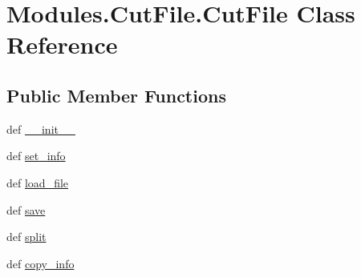 \hypertarget{classModules_1_1CutFile_1_1CutFile}{\section{Modules.\-Cut\-File.\-Cut\-File Class Reference}
\label{classModules_1_1CutFile_1_1CutFile}
}
\subsection*{Public Member Functions}
\begin{DoxyCompactItemize}
\item 
def \hyperlink{classModules_1_1CutFile_1_1CutFile_a77f945f7b5806ad366101621cf0f1090}{\-\_\-\-\_\-init\-\_\-\-\_\-}
\item 
def \hyperlink{classModules_1_1CutFile_1_1CutFile_abbefde5e9218868e815110a427b89f82}{set\-\_\-info}
\item 
def \hyperlink{classModules_1_1CutFile_1_1CutFile_a3e74135fa738e9fbee272b0cb3c4c560}{load\-\_\-file}
\item 
def \hyperlink{classModules_1_1CutFile_1_1CutFile_a1b5dd6971e91ee35f8a7a432410fd9d1}{save}
\item 
def \hyperlink{classModules_1_1CutFile_1_1CutFile_acdb33341563b9a0806c02e2566a0dbdb}{split}
\item 
def \hyperlink{classModules_1_1CutFile_1_1CutFile_a69f3dc0b72f13193d66fbb2d672bb7e7}{copy\-\_\-info}
\end{DoxyCompactItemize}
